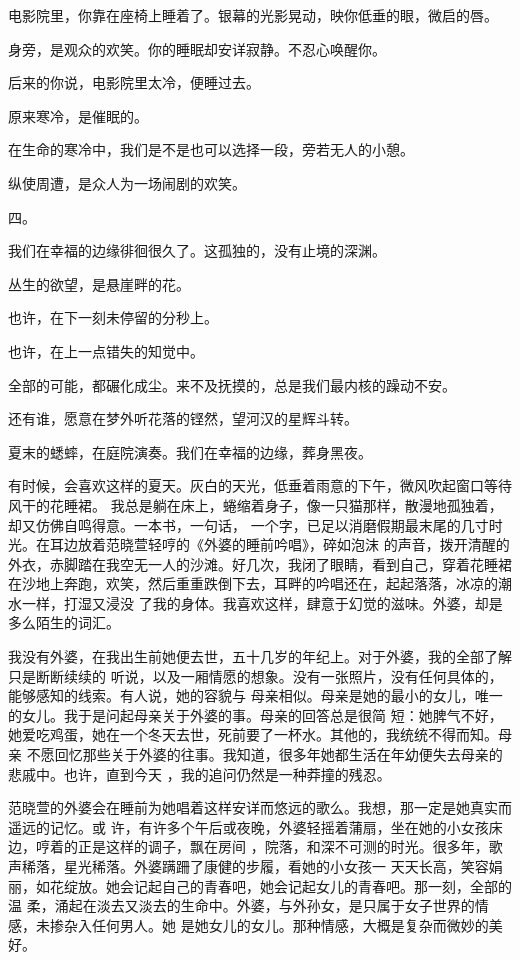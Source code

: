 \documentclass[12pt,a4paper]{article}
\newcommand{\subpart}[1]{
	\begingroup \par
	\vspace{1ex} \centering #1
	\par \endgroup \nopagebreak[4]
}
\begin{document}
		电影院里，你靠在座椅上睡着了。银幕的光影晃动，映你低垂的眼，微启的唇。\par
		身旁，是观众的欢笑。你的睡眠却安详寂静。不忍心唤醒你。\par
		后来的你说，电影院里太冷，便睡过去。\par
		原来寒冷，是催眠的。\par
		在生命的寒冷中，我们是不是也可以选择一段，旁若无人的小憩。\par
		纵使周遭，是众人为一场闹剧的欢笑。

		\subpart{四。}

		我们在幸福的边缘徘徊很久了。这孤独的，没有止境的深渊。

		丛生的欲望，是悬崖畔的花。\par
		也许，在下一刻未停留的分秒上。\par
		也许，在上一点错失的知觉中。\par
		全部的可能，都碾化成尘。来不及抚摸的，总是我们最内核的躁动不安。

		还有谁，愿意在梦外听花落的铿然，望河汉的星辉斗转。

		夏末的蟋蟀，在庭院演奏。我们在幸福的边缘，葬身黑夜。

	\endwriting



		有时候，会喜欢这样的夏天。灰白的天光，低垂着雨意的下午，微风吹起窗口等待风干的花睡裙。
	我总是躺在床上，蜷缩着身子，像一只猫那样，散漫地孤独着，却又仿佛自鸣得意。一本书，一句话，
	一个字，已足以消磨假期最末尾的几寸时光。在耳边放着范晓萱轻哼的《外婆的睡前吟唱》，碎如泡沫
	的声音，拨开清醒的外衣，赤脚踏在我空无一人的沙滩。好几次，我闭了眼睛，看到自己，穿着花睡裙
	在沙地上奔跑，欢笑，然后重重跌倒下去，耳畔的吟唱还在，起起落落，冰凉的潮水一样，打湿又浸没
	了我的身体。我喜欢这样，肆意于幻觉的滋味。外婆，却是多么陌生的词汇。

		我没有外婆，在我出生前她便去世，五十几岁的年纪上。对于外婆，我的全部了解只是断断续续的
	听说，以及一厢情愿的想象。没有一张照片，没有任何具体的，能够感知的线索。有人说，她的容貌与
	母亲相似。母亲是她的最小的女儿，唯一的女儿。我于是问起母亲关于外婆的事。母亲的回答总是很简
	短：她脾气不好，她爱吃鸡蛋，她在一个冬天去世，死前要了一杯水。其他的，我统统不得而知。母亲
	不愿回忆那些关于外婆的往事。我知道，很多年她都生活在年幼便失去母亲的悲戚中。也许，直到今天
	，我的追问仍然是一种莽撞的残忍。

		范晓萱的外婆会在睡前为她唱着这样安详而悠远的歌么。我想，那一定是她真实而遥远的记忆。或
	许，有许多个午后或夜晚，外婆轻摇着蒲扇，坐在她的小女孩床边，哼着的正是这样的调子，飘在房间
	，院落，和深不可测的时光。很多年，歌声稀落，星光稀落。外婆蹒跚了康健的步履，看她的小女孩一
	天天长高，笑容娟丽，如花绽放。她会记起自己的青春吧，她会记起女儿的青春吧。那一刻，全部的温
	柔，涌起在淡去又淡去的生命中。外婆，与外孙女，是只属于女子世界的情感，未掺杂入任何男人。她
	是她女儿的女儿。那种情感，大概是复杂而微妙的美好。
\end{document}
